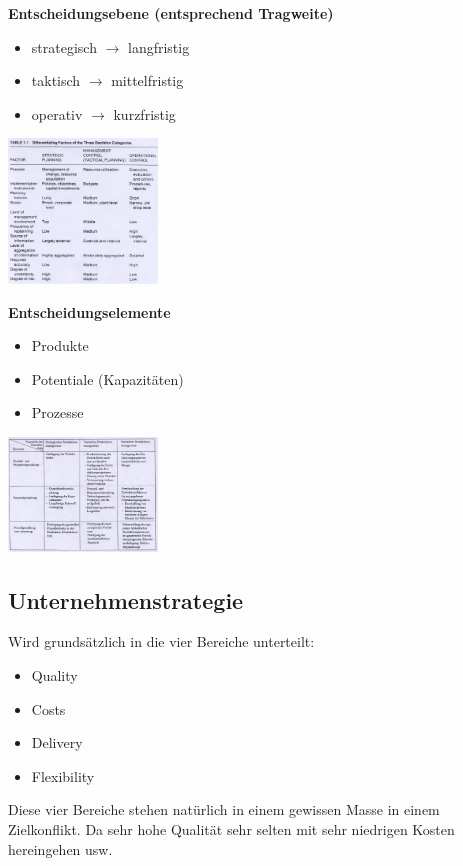 \documentclass{report}
\newenvironment{Figure}
	{\par\medskip\noindent\minipage{\linewidth}}
	{\endminipage\par\medskip}
\theoremstyle{definition}
\theoremstyle{example}
\begin{document}
\textbf{Entscheidungsebene (entsprechend Tragweite)}
\begin{itemize}
   \item strategisch $\rightarrow$ langfristig
   \item taktisch $\rightarrow$ mittelfristig
   \item operativ $\rightarrow$ kurzfristig
\end{itemize}

\begin{Figure}
\centering
\includegraphics[width=150px]{img/OMEntscheidungsebene.png}
	\label{fig:Entscheidungsebene im OM}
\end{Figure}

\textbf{Entscheidungselemente}
\begin{itemize}
   \item Produkte
   \item Potentiale (Kapazitäten)
   \item Prozesse
\end{itemize}

\begin{Figure}
\centering
\includegraphics[width=150px]{img/OMEntscheidungselemente.png}
	\label{fig:Entscheidungselemente im OM}
\end{Figure}


   \subsection{Unternehmenstrategie}
Wird grundsätzlich in die vier Bereiche unterteilt:
\begin{itemize}
   \item Quality
   \item Costs
   \item Delivery
   \item Flexibility
\end{itemize}
Diese vier Bereiche stehen natürlich in einem gewissen Masse in einem Zielkonflikt. Da sehr hohe Qualität sehr selten mit sehr niedrigen Kosten hereingehen usw.
\end{document}
